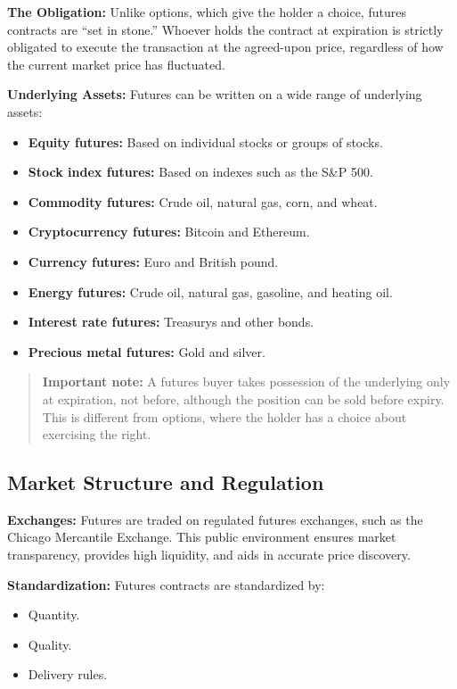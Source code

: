 \documentclass[12pt,openany]{book}
\begin{document}
\textbf{The Obligation:} Unlike options, which give the holder a choice, futures contracts are ``set in stone.'' Whoever holds the contract at expiration is strictly obligated to execute the transaction at the agreed-upon price, regardless of how the current market price has fluctuated.

\textbf{Underlying Assets:} Futures can be written on a wide range of underlying assets:

\begin{itemize}[leftmargin=*]
    \item \textbf{Equity futures:} Based on individual stocks or groups of stocks.
    \item \textbf{Stock index futures:} Based on indexes such as the S\&P 500.
    \item \textbf{Commodity futures:} Crude oil, natural gas, corn, and wheat.
    \item \textbf{Cryptocurrency futures:} Bitcoin and Ethereum.
    \item \textbf{Currency futures:} Euro and British pound.
    \item \textbf{Energy futures:} Crude oil, natural gas, gasoline, and heating oil.
    \item \textbf{Interest rate futures:} Treasurys and other bonds.
    \item \textbf{Precious metal futures:} Gold and silver.
\end{itemize}

\begin{quote}
    \textbf{Important note:} A futures buyer takes possession of the underlying only at expiration, not before, although the position can be sold before expiry. This is different from options, where the holder has a choice about exercising the right.
\end{quote}

\subsection{Market Structure and Regulation}

\textbf{Exchanges:} Futures are traded on regulated futures exchanges, such as the Chicago Mercantile Exchange. This public environment ensures market transparency, provides high liquidity, and aids in accurate price discovery.

\textbf{Standardization:} Futures contracts are standardized by:

\begin{itemize}[leftmargin=*]
    \item Quantity.
    \item Quality.
    \item Delivery rules.
\end{itemize}
\end{document}
